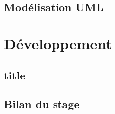 \documentclass{polytech/polytech}
\begin{document}
\chapter{Modélisation UML}


\part{Développement}


\chapter{title}


\chapter{Bilan du stage}


\appendix
\end{document}
